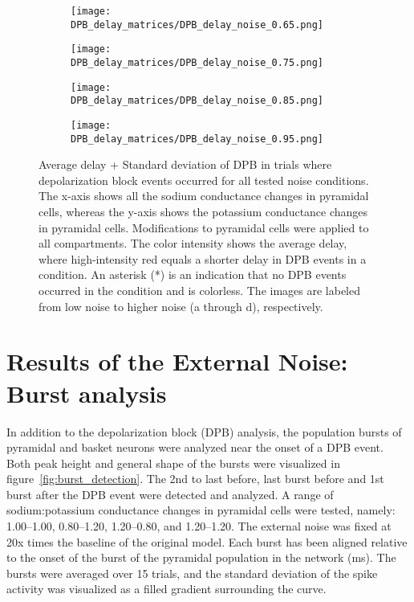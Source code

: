 \begin{figure}[htbp]
    \centering
    \begin{subfigure}{0.48\textwidth}
        \texttt{[image: DPB\_delay\_matrices/DPB\_delay\_noise\_0.65.png]}
        \caption{} %
    \end{subfigure}\hfill
    \begin{subfigure}{0.48\textwidth}
        \texttt{[image: DPB\_delay\_matrices/DPB\_delay\_noise\_0.75.png]}
        \caption{} %
    \end{subfigure}

    \bigskip %

    \begin{subfigure}{0.48\textwidth}
        \texttt{[image: DPB\_delay\_matrices/DPB\_delay\_noise\_0.85.png]}
        \caption{} %
    \end{subfigure}\hfill
    \begin{subfigure}{0.48\textwidth}
        \texttt{[image: DPB\_delay\_matrices/DPB\_delay\_noise\_0.95.png]}
        \caption{} %
    \end{subfigure}

    \caption[DPB delay matrices]{Average delay + Standard deviation of DPB in trials where depolarization block events occurred for all tested noise conditions.
        The x-axis shows all the sodium conductance changes in pyramidal cells, whereas the y-axis shows the potassium conductance changes in pyramidal cells.
        Modifications to pyramidal cells were applied to all compartments.
        The color intensity shows the average delay, where high-intensity red equals a shorter delay in DPB events in a condition.
        An asterisk (*) is an indication that no DPB events occurred in the condition and is colorless.
        The images are labeled from low noise to higher noise (a through d), respectively.}\label{fig:dpb_delay_matrices}
\end{figure}
\pagebreak

\section{Results of the External Noise: Burst analysis}
In addition to the depolarization block (DPB) analysis, the population bursts of pyramidal and basket neurons were analyzed near the onset of a DPB event.
Both peak height and general shape of the bursts were visualized in figure~\ref{fig:burst_detection}.
The 2nd to last before, last burst before and 1st burst after the DPB event were detected and analyzed.
A range of sodium:potassium conductance changes in pyramidal cells were tested, namely: 1.00--1.00, 0.80--1.20, 1.20--0.80, and 1.20--1.20.
The external noise was fixed at 20x times the baseline of the original model.
Each burst has been aligned relative to the onset of the burst of the pyramidal population in the network (ms).
The bursts were averaged over 15 trials, and the standard deviation of the spike activity was visualized as a filled gradient surrounding the curve.


